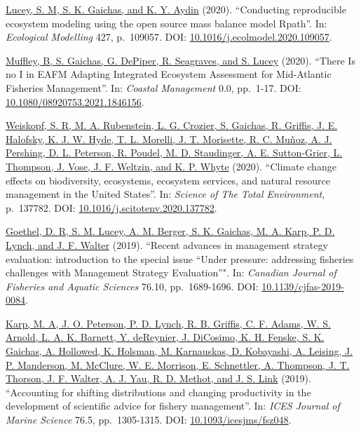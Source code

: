 \documentclass[11pt, a4paper]{awesome-cv}
\begin{document}
\protect\hyperlink{cite-lucey_conducting_2020}{Lucey, S. M, S. K. Gaichas, and
K. Y. Aydin} (2020). ``Conducting
reproducible ecosystem modeling using the open source mass balance
model Rpath''. In: \emph{Ecological Modelling} 427, p.~109057. DOI:
\href{https://doi.org/10.1016\%2Fj.ecolmodel.2020.109057}{10.1016/j.ecolmodel.2020.109057}.

\protect\hyperlink{cite-muffley_there_2020}{Muffley, B, S. Gaichas, G. DePiper,
R. Seagraves, and S. Lucey} (2020). ``There Is
no I in EAFM Adapting Integrated Ecosystem Assessment for Mid-Atlantic
Fisheries Management''. In: \emph{Coastal Management} 0.0, pp.~1-17. DOI:
\href{https://doi.org/10.1080\%2F08920753.2021.1846156}{10.1080/08920753.2021.1846156}.

\protect\hyperlink{cite-weiskopf_climate_2020}{Weiskopf, S. R, M. A.
Rubenstein, L. G. Crozier, S. Gaichas, R. Griffis, J. E. Halofsky, K.
J. W. Hyde, T. L. Morelli, J. T. Morisette, R. C. Muñoz, A. J.
Pershing, D. L. Peterson, R. Poudel, M. D. Staudinger, A. E.
Sutton-Grier, L. Thompson, J. Vose, J. F. Weltzin, and K. P.
Whyte} (2020). ``Climate change effects on
biodiversity, ecosystems, ecosystem services, and natural resource
management in the United States''. In: \emph{Science of The Total
Environment}, p.~137782. DOI:
\href{https://doi.org/10.1016\%2Fj.scitotenv.2020.137782}{10.1016/j.scitotenv.2020.137782}.

\protect\hyperlink{cite-goethel_recent_2019}{Goethel, D. R, S. M. Lucey, A. M.
Berger, S. K. Gaichas, M. A. Karp, P. D. Lynch, and J. F.
Walter} (2019). ``Recent advances in
management strategy evaluation: introduction to the special issue
``Under pressure: addressing fisheries challenges with Management
Strategy Evaluation''". In: \emph{Canadian Journal of Fisheries and Aquatic
Sciences} 76.10, pp.~1689-1696. DOI:
\href{https://doi.org/10.1139\%2Fcjfas-2019-0084}{10.1139/cjfas-2019-0084}.

\protect\hyperlink{cite-karp_accounting_2019}{Karp, M. A, J. O. Peterson, P. D.
Lynch, R. B. Griffis, C. F. Adams, W. S. Arnold, L. A. K. Barnett, Y.
deReynier, J. DiCosimo, K. H. Fenske, S. K. Gaichas, A. Hollowed, K.
Holsman, M. Karnauskas, D. Kobayashi, A. Leising, J. P. Manderson, M.
McClure, W. E. Morrison, E. Schnettler, A. Thompson, J. T. Thorson, J.
F. Walter, A. J. Yau, R. D. Methot, and J. S.
Link} (2019). ``Accounting for shifting
distributions and changing productivity in the development of
scientific advice for fishery management''. In: \emph{ICES Journal of Marine
Science} 76.5, pp.~1305-1315. DOI:
\href{https://doi.org/10.1093\%2Ficesjms\%2Ffsz048}{10.1093/icesjms/fsz048}.
\end{document}
